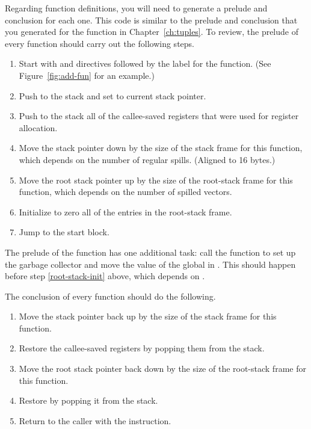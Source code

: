 \documentclass[11pt]{book}
\begin{document}
Regarding function definitions, you will need to generate a prelude
and conclusion for each one. This code is similar to the prelude and
conclusion that you generated for the  function in
Chapter~\ref{ch:tuples}. To review, the prelude of every function
should carry out the following steps.
\begin{enumerate}
\item Start with  and  directives followed
  by the label for the function.  (See Figure~\ref{fig:add-fun} for an
  example.)
\item Push  to the stack and set  to current stack
  pointer.
\item Push to the stack all of the callee-saved registers that were
  used for register allocation.
\item Move the stack pointer  down by the size of the stack
  frame for this function, which depends on the number of regular
  spills. (Aligned to 16 bytes.)
\item Move the root stack pointer  up by the size of the
  root-stack frame for this function, which depends on the number of
  spilled vectors. \label{root-stack-init}
\item Initialize to zero all of the entries in the root-stack frame.
\item Jump to the start block.
\end{enumerate}
The prelude of the  function has one additional task: call
the  function to set up the garbage collector and
move the value of the global  in
. This should happen before step \ref{root-stack-init}
above, which depends on .

The conclusion of every function should do the following.
\begin{enumerate}
\item Move the stack pointer back up by the size of the stack frame
  for this function.
\item Restore the callee-saved registers by popping them from the
  stack.
\item Move the root stack pointer back down by the size of the
  root-stack frame for this function.
\item Restore  by popping it from the stack.
\item Return to the caller with the  instruction.
\end{enumerate}
\end{document}
